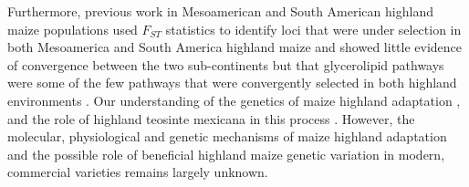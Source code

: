 \documentclass[9pt,twocolumn,twoside,lineno]{BioRxiv}
\begin{document}
Furthermore, previous work in Mesoamerican and South American highland maize populations used $F_{ST}$ statistics to identify loci that were under selection in both Mesoamerica and South America highland maize and showed little evidence of convergence between the two sub-continents but that glycerolipid pathways were some of the few pathways that were convergently selected in both highland environments  \cite{Takuno2015-uj}.
Our understanding of the genetics of maize highland adaptation \cite{Wang2020-mp, Takuno2015-uj, Crow2020-gene}, and the role of highland teosinte mexicana in this process \cite{Hufford2013-gs, Lauter2004-eq, pyhajarvi2013}.
However, the molecular, physiological and genetic mechanisms of maize highland adaptation and the possible role of beneficial highland maize genetic variation in modern, commercial varieties remains largely unknown.
\end{document}

